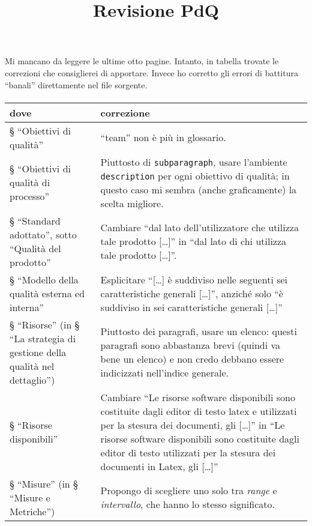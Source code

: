 \documentclass[a4paper]{article}
\title{Revisione PdQ}
\author{\GG}
\begin{document}
\maketitle

\paragraph{}
Mi mancano da leggere le ultime otto pagine. Intanto, in tabella trovate le correzioni che consiglierei di apportare. Invece ho corretto gli errori di battitura “banali” direttamente nel file sorgente.

\paragraph{}
\begin{center}
\begin{tabular}{| p{4cm} | p{7cm} |}
	\hline
	\textbf{dove} & \textbf{correzione} \\ \hline
	\hline
	§ “Obiettivi di qualità” & “team” non è più in glossario. \\ \hline
	§ “Obiettivi di qualità di processo” & Piuttosto di \texttt{subparagraph}, usare l'ambiente \texttt{description} per ogni obiettivo di qualità; in questo caso mi sembra (anche graficamente) la scelta migliore. \\ \hline
	§ “Standard adottato”, sotto “Qualità del prodotto” & Cambiare “dal lato dell’utilizzatore che utilizza tale prodotto [\dots]” in “dal lato di chi utilizza tale prodotto [\dots]”. \\ \hline
	§ “Modello della qualità esterna ed interna” & Esplicitare “[\dots] è suddiviso nelle seguenti sei caratteristiche generali [\dots]”, anziché solo “è suddiviso in sei caratteristiche generali [\dots]” \\ \hline
	§ “Risorse” (in § “La strategia di gestione della qualità nel dettaglio”) & Piuttosto dei paragrafi, usare un elenco: questi paragrafi sono abbastanza brevi (quindi va bene un elenco) e non credo debbano essere indicizzati nell'indice generale. \\ \hline
	§ “Risorse disponibili” & Cambiare “Le risorse software disponibili sono costituite dagli editor di testo latex e utilizzati per la stesura dei documenti, gli \gloss{IDE} [\dots]” in “Le risorse software disponibili sono costituite dagli editor di testo utilizzati per la stesura dei documenti in Latex, gli \gloss{IDE} [\dots]” \\ \hline
	§ “Misure” (in § “Misure e Metriche”) & Propongo di scegliere uno solo tra \emph{range} e \emph{intervallo}, che hanno lo stesso significato. \\ \hline

\end{tabular}
\end{center}
\end{document}
